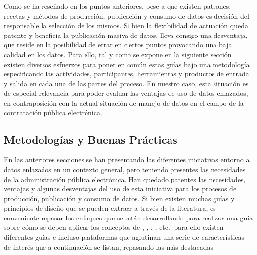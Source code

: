 Como se ha reseñado en los puntos anteriores, pese a que existen patrones, recetas y métodos de producción, publicación y consumo de datos
es decisión del responsable la selección de los mismos. Si bien la flexibilidad de actuación queda patente y beneficia
la publicación masiva de datos, lleva consigo una desventaja, que reside en la posibilidad de errar en ciertos puntos provocando
una baja calidad en los datos. Para ello, tal y como se expone en la siguiente sección existen diversos esfuerzos para poner en común
estas guías bajo una metodología especificando las actividades, participantes, herramientas y productos de entrada y salida
en cada una de las partes del proceso. En nuestro caso, esta situación es de especial relevancia para poder evaluar las ventajas
de uso de datos enlazados, en contraposición con la actual situación de manejo de datos en el campo de la contratación pública
electrónica.

\subsection{Metodologías y Buenas Prácticas}\label{metodologias}
En las anteriores secciones se han presentando las diferentes iniciativas entorno a datos enlazados en un contexto
general, pero teniendo presentes las necesidades de la administración pública electrónica. Han quedado patentes las necesidades,
ventajas y algunas desventajas del uso de esta iniciativa para los procesos de producción, publicación y consumo de datos. Si 
bien existen muchas guías y principios de diseño que se pueden extraer a través de la literatura, es conveniente repasar
los enfoques que se están desarrollando para realizar una guía sobre cómo se deben aplicar los conceptos de  \linkeddata, \opendata, \ogd, \lod, etc., 
para ello existen diferentes guías e incluso plataformas que aglutinan una serie de características de interés que a continuación se listan, 
repasando las más destacadas.

